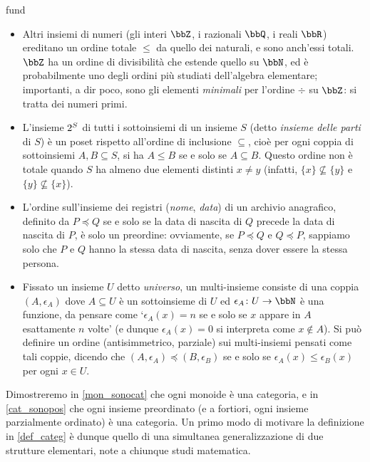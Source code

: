 \begin{hExamples}{fund}
\begin{itemize}
        Una maniera alternativa di ordinare l'insieme \(\bbN\) dei naturali è mediante la relazione di \emph{divisibilità} indotta dall'operazione di prodotto: \(m\div n\) se e solo se \(n = k\cdot m\) per qualche \(k\in\bbN\). Questa relazione è un ordine parziale, non totale, perché alcuni numeri potrebbero essere \emph{incomparabili}: ad esempio, non è vero né che \(2\div 3\) né che \(3\div 2\).
  \item Altri insiemi di numeri (gli interi \(\bbZ\), i razionali \(\bbQ\), i reali \(\bbR\)) ereditano un ordine totale \(\le\)	da quello dei naturali, e sono anch'essi totali. \(\bbZ\) ha un ordine di divisibilità che estende quello su \(\bbN\), ed è probabilmente uno degli ordini più studiati dell'algebra elementare; importanti, a dir poco, sono gli elementi \emph{minimali} per l'ordine \(\div\) su \(\bbZ\): si tratta dei numeri primi.
  \item L'insieme \(2^{S}\) di tutti i sottoinsiemi di un insieme \(S\) (detto \emph{insieme  delle parti} di \(S\)) è un poset rispetto all'ordine di inclusione \(\subseteq\), cioè per ogni coppia di sottoinsiemi \(A,B\subseteq S\), si ha \(A\le B\) se e solo se \(A\subseteq B\). Questo ordine non è totale quando \(S\) ha almeno due elementi distinti \(x\ne y\) (infatti, \(\{x\}\not\subseteq\{y\}\) e \(\{y\}\not\subseteq\{x\}\)).
  \item L'ordine sull'insieme dei registri (\emph{nome}, \emph{data}) di un archivio anagrafico, definito da \(P\preceq Q\) se e solo se la data di nascita di \(Q\) precede la data di nascita di \(P\), è solo un preordine: ovviamente, se \(P\preceq Q\) e \(Q\preceq P\), sappiamo solo che \(P\) e \(Q\) hanno la stessa data di nascita, senza dover essere la stessa persona.
  \item Fissato un insieme \(U\) detto \emph{universo}, un multi-insieme consiste di una coppia \((A,\epsilon_A)\) dove \(A\subseteq U\) è un sottoinsieme di \(U\) ed \(\epsilon_A \colon U \to \bbN\) è una funzione, da pensare come `\(\epsilon_A(x)=n\) se e solo se \(x\) appare in \(A\) esattamente \(n\) volte' (e dunque \(\epsilon_A(x)=0\) si interpreta come \(x\notin A\)). Si può definire un ordine (antisimmetrico, parziale) sui multi-insiemi pensati come tali coppie, dicendo che \((A,\epsilon_A)\preceq (B,\epsilon_B)\) se e solo se \(\epsilon_A(x)\le \epsilon_B(x)\) per ogni \(x\in U\).
 \end{itemize}
\end{hExamples}
Dimostreremo in \ref{mon_sonocat} che ogni monoide è una categoria, e in \ref{cat_sonopos} che ogni insieme preordinato (e a fortiori, ogni insieme parzialmente ordinato) è una categoria. Un primo modo di motivare la definizione in \ref{def_categ} è dunque quello di una simultanea generalizzazione di due strutture elementari, note a chiunque studi matematica.

